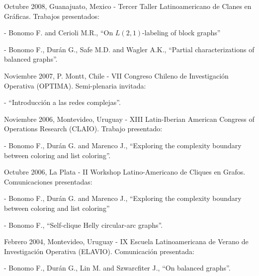 \item Octubre 2008, Guanajuato, Mexico - Tercer Taller
Latinoamericano de Clanes en Gr\'aficas. Trabajos presentados:
\begin{compactitem}
\item[-] Bonomo F. and Cerioli M.R., ``On $L(2,1)$-labeling of
block graphs'' \item[-] Bonomo F., Dur\'an G., Safe M.D. and
Wagler A.K., ``Partial characterizations of balanced graphs''.
\end{compactitem}

\smallskip

\item Noviembre 2007, P. Montt, Chile - VII Congreso Chileno de
Investigaci\'on Ope\-ra\-ti\-va (OPTIMA). Semi-plenaria invitada:
\begin{compactitem}
\item[-] ``Introducci\'on a las redes complejas''.
\end{compactitem}

\smallskip

\item Noviembre 2006, Montevideo, Uruguay - XIII Latin-Iberian
American Congress of Operations Research (CLAIO). Trabajo
presentado:
\begin{compactitem}
\item[-] Bonomo F., Dur\'an G. and Marenco J., ``Exploring the
complexity boundary between coloring and list coloring''.
\end{compactitem}

\smallskip


\item Octubre 2006, La Plata - II Workshop Latino-Americano de
Cliques en Grafos. Comunicaciones presentadas:
\begin{compactitem}
\item[-] Bonomo F., Dur\'an G. and Marenco J., ``Exploring the
complexity boundary between coloring and list coloring'' \item[-]
Bonomo F., ``Self-clique Helly circular-arc graphs''.
\end{compactitem}

\smallskip

\item Febrero 2004, Montevideo, Uruguay - IX Escuela
Latinoamericana de Verano de Investigaci\'on Operativa (ELAVIO).
Comunicaci\'on presentada:
\begin{compactitem}
\item[-] Bonomo F., Dur\'an G., Lin M. and Szwarcfiter J., ``On
balanced graphs''.
\end{compactitem}

